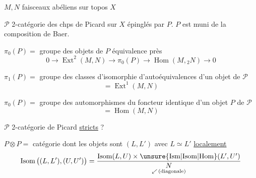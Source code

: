 $M,N$ faisceaux abéliens sur topos $X$

$\mathscr{P}$ 2-catégorie des chps de Picard sur $X$
épinglés par $P$. $P$ est muni de
la composition de Baer.

$\pi_0(P)=$ groupe des objets de $P$  équivalence
près
\[
0\to\operatorname{Ext}^{2}(M,N)\to\pi_0(P)\to\operatorname{Hom}(M,{}_{2}N)\to0
\]

$\pi_1(P)=$ groupe des classes d'isomorphie
d'autoéquivalences d'un objet de
$\mathscr{P}$
\[
=\operatorname{Ext}^{1}(M,N)
\]

$\pi_0(P)=$ groupe des automorphismes du
foncteur identique d'un
objet $P$ de $\mathscr{P}$
\[
=\operatorname{Hom}(M,N)
\]

$\mathscr{P}$ 2-catégorie de Picard \uline{stricts} ?

$P\otimes P=$ catégorie dont les objets sont
$(L,L')$ avec  $L\simeq L'$ \uline{localement}
\[
\operatorname{Isom}\big((L,L'),(U,U')\big)=
\frac{\operatorname{Isom}(L,U)\times\operatorname{\unsure{Ism|Isom|Hom}}(L',U')}{\underset{\swarrow\,(\text{diagonale})}{N}}
\]
